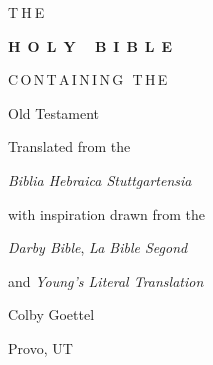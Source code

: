 \begin{titlepage}
    \begin{center}
        {T$\:$H$\:$E}
        
        \vspace{10pt}
        
        {\Huge \textbf{\textsc{H$\;\:$O$\;\:$L$\;\:$Y$\;\:$ $\;\:$B$\;\:$I$\;\:$B$\;\:$L$\;\:$E}}}
        
        \vspace{35pt}
        
        {C$\,$O$\,$N$\,$T$\,$A$\,$I$\,$N$\,$I$\,$N$\,$G$\,$ $\,$T$\,$H$\,$E}
        
        \vspace{10pt}
        
        {\huge Old Testament}
        
        \vspace{100pt}
        
        {Translated from the}
        
        \vspace{5pt}
        
        {\large \emph{Biblia Hebraica Stuttgartensia}}
        
        \vspace{5pt}
        
        {with inspiration drawn from the}
        
        \vspace{5pt}
        
        {\emph{Darby Bible}, \emph{La Bible Segond}}
        
        \vspace{5pt}
        
        {and \emph{Young's Literal Translation}}
        
        \vfill
        
        {\large Colby Goettel}
        
        \vspace{2.5pt}
        
        {\small Provo, UT}
    \end{center}
\end{titlepage}
